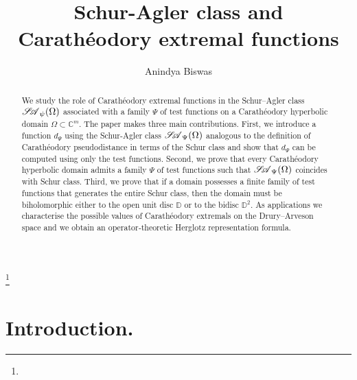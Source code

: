 \documentclass[12pt]{amsart}
\theoremstyle{definition}
\numberwithin{equation}{section}
\newcommand{\SA}{\mathscr{S\mspace{-5mu}A}}
\begin{document}

\baselineskip=17pt


\title{Schur-Agler class and Carath\'eodory extremal functions}

\author[A. Biswas]{Anindya Biswas}
\address{Department of Mathematics and Statistics, Masaryk University, Brno}
\address{ORCID: 0000-0002-7805-9446}
\thanks{}



\date{}


\begin{abstract}
	
	We study the role of Carathéodory extremal functions in the Schur–Agler class $\SA_\psi(\Omega)$ associated with a family \(\Psi\) of test functions on a Carath\'eodory hyperbolic domain $\Omega\subset\mathbb{C}^m$.
	The paper makes three main contributions. 
	First, we introduce a function $d_\Psi$ using the Schur-Agler class $\SA_\Psi(\Omega)$ analogous to the definition of Carath\'eodory pseudodistance in terms of the Schur class and show that $d_\Psi$ can be computed using only the test functions. Second, we prove that every Carathéodory hyperbolic domain admits a family $\Psi$ of test functions such that $\SA_\Psi(\Omega)$ coincides with Schur class. Third, we prove that if a domain possesses a finite family of test functions that generates the entire Schur class, then the domain must be biholomorphic either to the open unit disc $\mathbb{D}$ or to the bidisc $\mathbb{D}^2$. As applications we characterise the possible values of Carathéodory extremals on the Drury–Arveson space and we obtain an operator‑theoretic Herglotz representation formula.
\end{abstract}



\maketitle



\section{Introduction.}
\end{document}
